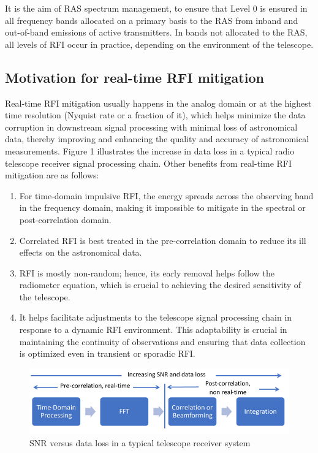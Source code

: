 It is the aim of RAS spectrum management, to ensure that Level 0 is ensured in all frequency bands allocated on a primary basis to the RAS from inband and out-of-band emissions of active transmitters. In bands not allocated to the RAS, all levels of RFI occur in practice, depending on the environment of the telescope. 


\subsection{Motivation for real-time RFI mitigation}
\label{subsection:hardware:introduction: motivations}

Real-time RFI mitigation usually happens in the analog domain or at the highest time resolution (Nyquist rate or a fraction of it), which helps minimize the data corruption in downstream signal processing with minimal loss of astronomical data, thereby improving and enhancing the quality and accuracy of astronomical measurements. Figure 1 illustrates the increase in data loss in a typical radio telescope receiver signal processing chain.
Other benefits from real-time RFI mitigation are as follows:

\begin{enumerate}
\item For time-domain impulsive RFI, the energy spreads across the observing band in the frequency domain, making it impossible to mitigate in the spectral or post-correlation domain.

\item Correlated RFI is best treated in the pre-correlation domain to reduce its ill effects on the astronomical data.

\item RFI is mostly non-random; hence, its early removal helps follow the radiometer equation, which is crucial to achieving the desired sensitivity of the telescope.

\item It helps facilitate adjustments to the telescope signal processing chain in response to a dynamic RFI environment. This adaptability is crucial in maintaining the continuity of observations and ensuring that data collection is optimized even in transient or sporadic RFI.
\end{enumerate}

\begin{figure}
    \centering
    \includegraphics[scale=0.8]{Hardware Excision Techniques/figures/rt.jpg}
    \caption{SNR versus data loss in a typical telescope receiver system}
    \label{fig:real-time-rfi}
\end{figure}


